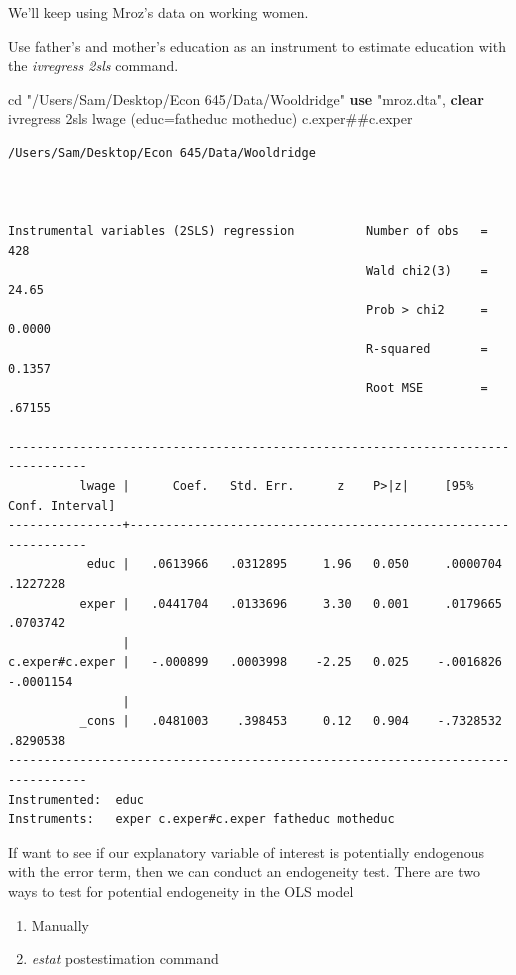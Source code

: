 \documentclass[
]{book}
\newenvironment{Shaded}{\begin{snugshade}}{\end{snugshade}}
\newcommand{\KeywordTok}[1]{\textcolor[rgb]{0.13,0.29,0.53}{\textbf{#1}}}
\newcommand{\NormalTok}[1]{#1}
\newcommand{\StringTok}[1]{\textcolor[rgb]{0.31,0.60,0.02}{#1}}
\providecommand{\tightlist}{%
  \setlength{\itemsep}{0pt}\setlength{\parskip}{0pt}}
\begin{document}
We'll keep using Mroz's data on working women.

Use father's and mother's education as an instrument to estimate education with the \emph{ivregress 2sls} command.

\begin{Shaded}
\begin{Highlighting}[]
\NormalTok{cd }\StringTok{"/Users/Sam/Desktop/Econ 645/Data/Wooldridge"}
\KeywordTok{use} \StringTok{"mroz.dta"}\NormalTok{, }\KeywordTok{clear}
\NormalTok{ivregress 2sls lwage (educ=fatheduc motheduc) c.exper\#\#c.exper}
\end{Highlighting}
\end{Shaded}

\begin{verbatim}
/Users/Sam/Desktop/Econ 645/Data/Wooldridge



Instrumental variables (2SLS) regression          Number of obs   =        428
                                                  Wald chi2(3)    =      24.65
                                                  Prob > chi2     =     0.0000
                                                  R-squared       =     0.1357
                                                  Root MSE        =     .67155

---------------------------------------------------------------------------------
          lwage |      Coef.   Std. Err.      z    P>|z|     [95% Conf. Interval]
----------------+----------------------------------------------------------------
           educ |   .0613966   .0312895     1.96   0.050     .0000704    .1227228
          exper |   .0441704   .0133696     3.30   0.001     .0179665    .0703742
                |
c.exper#c.exper |   -.000899   .0003998    -2.25   0.025    -.0016826   -.0001154
                |
          _cons |   .0481003    .398453     0.12   0.904    -.7328532    .8290538
---------------------------------------------------------------------------------
Instrumented:  educ
Instruments:   exper c.exper#c.exper fatheduc motheduc
\end{verbatim}

If want to see if our explanatory variable of interest is potentially
endogenous with the error term, then we can conduct an endogeneity test.
There are two ways to test for potential endogeneity in the OLS model

\begin{enumerate}
\def\labelenumi{\arabic{enumi}.}
\tightlist
\item
  Manually
\item
  \emph{estat} postestimation command
\end{enumerate}
\end{document}
